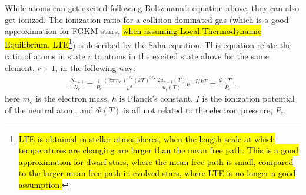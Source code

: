 While atoms can get excited following Boltzmann's equation above, they can also get ionized. The
ionization ratio for a collision dominated gas (which is a good approximation for FGKM stars,
\hl{when assuming Local Thermodynamic Equilibrium, LTE}\footnote{\hl{LTE is obtained in stellar
atmospheres, when the length scale at which temperatures are changing are larger than the mean free
path. This is a good approximation for dwarf stars, where the mean free path is small, compared to
the larger mean free path in evolved stars, where LTE is no longer a good assumption.}}) is
described by the Saha equation. This equation relate the ratio of atoms in state $r$ to atoms in the
excited state above for the same element, $r+1$, in the following way:
\begin{align}
  \frac{N_{r+1}}{N_r} = \frac{1}{P_e} \frac{(2\pi m_e)^{3/2}(kT)^{5/2}}{h^3} \frac{2u_{r+1}(T)}{u_r(T)} e^{-I/kT} = \frac{\Phi(T)}{P_e} \tag*{Saha}\label{eq:saha}
\end{align}
here $m_e$ is the electron mass, $h$ is Planck's constant, $I$ is the ionization potential of the
neutral atom, and $\Phi(T)$ is all not related to the electron pressure, $P_e$.

